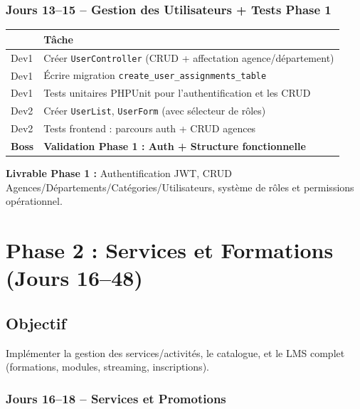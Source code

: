 \documentclass[12pt,a4paper]{report}
\begin{document}
\subsection*{Jours 13--15 -- Gestion des Utilisateurs + Tests Phase 1}

\begin{tabularx}{\textwidth}{l X}
    \toprule
    & \textbf{Tâche} \\
    \midrule
    Dev1 & Créer \texttt{UserController} (CRUD + affectation agence/département) \\
    Dev1 & Écrire migration \texttt{create\_user\_assignments\_table} \\
    Dev1 & Tests unitaires PHPUnit pour l'authentification et les CRUD \\
    Dev2 & Créer \texttt{UserList}, \texttt{UserForm} (avec sélecteur de rôles) \\
    Dev2 & Tests frontend : parcours auth + CRUD agences \\
    \textbf{Boss} & \textbf{Validation Phase 1 : Auth + Structure fonctionnelle} \\
    \bottomrule
\end{tabularx}

\textbf{Livrable Phase 1 :} Authentification JWT, CRUD Agences/Départements/Catégories/Utilisateurs, système de rôles et permissions opérationnel.

\chapter{Phase 2 : Services et Formations (Jours 16--48)}

\section*{Objectif}
Implémenter la gestion des services/activités, le catalogue, et le LMS complet (formations, modules, streaming, inscriptions).

\subsection*{Jours 16--18 -- Services et Promotions}
\end{document}

